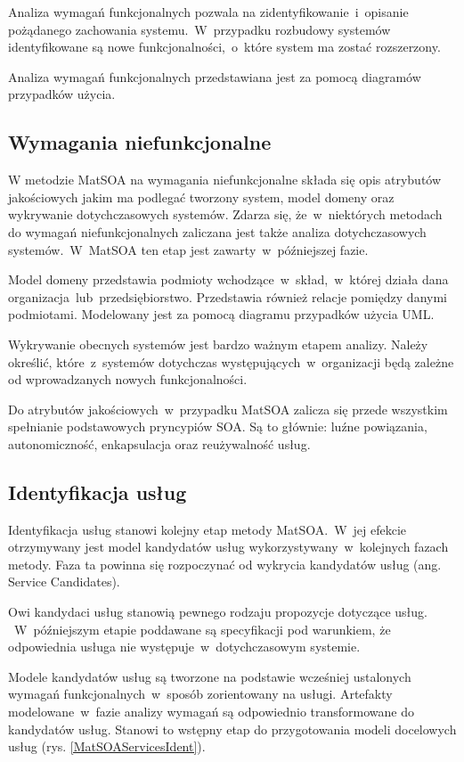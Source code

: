 Analiza wymagań funkcjonalnych pozwala na zidentyfikowanie~i~opisanie pożądanego zachowania systemu.~W~przypadku rozbudowy systemów identyfikowane są nowe funkcjonalności,~o~które system ma zostać rozszerzony.

Analiza wymagań funkcjonalnych przedstawiana jest za pomocą diagramów przypadków użycia.

\subsection*{Wymagania niefunkcjonalne}
W metodzie MatSOA na wymagania niefunkcjonalne składa się opis atrybutów jakościowych jakim ma podlegać tworzony system, model domeny oraz wykrywanie dotychczasowych systemów. Zdarza się, że~w~niektórych metodach do wymagań niefunkcjonalnych zaliczana jest także analiza dotychczasowych systemów.~W~MatSOA ten etap jest zawarty~w~późniejszej fazie. 

Model domeny przedstawia podmioty wchodzące~w~skład,~w~której działa dana organizacja~lub~przedsiębiorstwo. Przedstawia również relacje pomiędzy danymi podmiotami. Modelowany jest za pomocą diagramu przypadków użycia UML.

Wykrywanie obecnych systemów jest bardzo ważnym etapem analizy. Należy określić, które~z~systemów dotychczas występujących~w~organizacji będą zależne od wprowadzanych nowych funkcjonalności.

Do atrybutów jakościowych~w~przypadku MatSOA zalicza się przede wszystkim spełnianie podstawowych pryncypiów SOA. Są to głównie: luźne powiązania, autonomiczność, enkapsulacja oraz reużywalność usług.

\subsection{Identyfikacja usług}
Identyfikacja usług stanowi kolejny etap metody MatSOA.~W~jej efekcie otrzymywany jest model kandydatów usług wykorzystywany~w~kolejnych fazach metody. 
Faza ta powinna się rozpoczynać od wykrycia kandydatów usług (ang. Service Candidates). 

Owi kandydaci usług stanowią pewnego rodzaju propozycje dotyczące usług. ~W~późniejszym etapie poddawane są specyfikacji pod warunkiem, że odpowiednia usługa nie występuje~w~dotychczasowym systemie.

Modele kandydatów usług są tworzone na podstawie wcześniej ustalonych wymagań funkcjonalnych~w~sposób zorientowany na usługi. Artefakty modelowane~w~fazie analizy wymagań są odpowiednio transformowane do kandydatów usług. Stanowi to wstępny etap do przygotowania modeli docelowych usług (rys. \ref{MatSOAServicesIdent}). 

